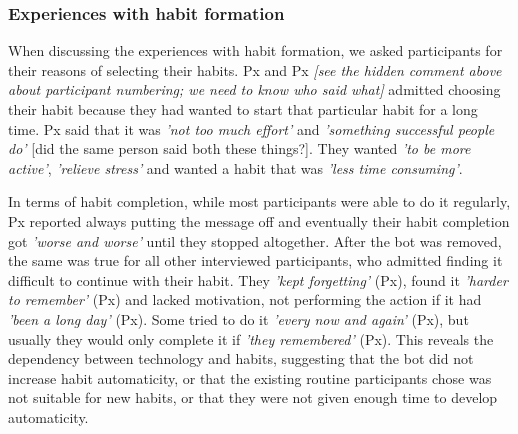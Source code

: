 \documentclass{scaffold/sigchi}
\begin{document}

 
\subsubsection{Experiences with habit formation}
When discussing the experiences with habit formation, we asked participants for their reasons of selecting their habits. Px and Px \emph{[see the hidden comment above about participant numbering; we need to know who said what]} admitted choosing their habit because they had wanted to start that particular habit for a long time. Px said that it was \textit{'not too much effort'} and \textit{'something successful people do'} [did the same person said both these things?]. They wanted \textit{'to be more active'}, \textit{'relieve stress'} and wanted a habit that was \textit{'less time consuming'}. 

In terms of habit completion, while most participants were able to do it regularly, Px reported always putting the message off and eventually their habit completion got \textit{'worse and worse'} until they stopped altogether. After the bot was removed, the same was true for all other interviewed participants, who admitted finding it difficult to continue with their habit. They \textit{'kept forgetting'} (Px), found it \textit{'harder to remember'} (Px) and lacked motivation, not performing the action if it had \textit{'been a long day'} (Px). Some tried to do it \textit{'every now and again'} (Px), but usually they would only complete it if \textit{'they remembered'} (Px). This reveals the dependency between technology and habits, suggesting that the bot did not increase habit automaticity, or that the existing routine participants chose was not suitable for new habits, or that they were not given enough time to develop automaticity.
\end{document}
